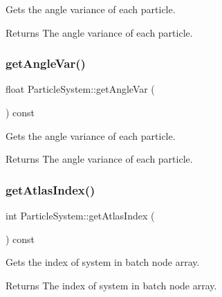 Gets the angle variance of each particle.

\begin{DoxyReturn}{Returns}
The angle variance of each particle. 
\end{DoxyReturn}
\mbox{\label{classParticleSystem_af95b74099e813301356d9de950c65b4b}} 
\subsubsection{\texorpdfstring{get\+Angle\+Var()}{getAngleVar()}\hspace{0.1cm}{\footnotesize\ttfamily [2/2]}}
{\footnotesize\ttfamily float Particle\+System\+::get\+Angle\+Var (\begin{DoxyParamCaption}{ }\end{DoxyParamCaption}) const\hspace{0.3cm}{\ttfamily [inline]}}

Gets the angle variance of each particle.

\begin{DoxyReturn}{Returns}
The angle variance of each particle. 
\end{DoxyReturn}
\mbox{\label{classParticleSystem_a43c52380c9e8caaaf1440758a35eec72}} 
\subsubsection{\texorpdfstring{get\+Atlas\+Index()}{getAtlasIndex()}\hspace{0.1cm}{\footnotesize\ttfamily [1/2]}}
{\footnotesize\ttfamily int Particle\+System\+::get\+Atlas\+Index (\begin{DoxyParamCaption}{ }\end{DoxyParamCaption}) const\hspace{0.3cm}{\ttfamily [inline]}}

Gets the index of system in batch node array.

\begin{DoxyReturn}{Returns}
The index of system in batch node array. 
\end{DoxyReturn}
\mbox{\label{classParticleSystem_a43c52380c9e8caaaf1440758a35eec72}} 
